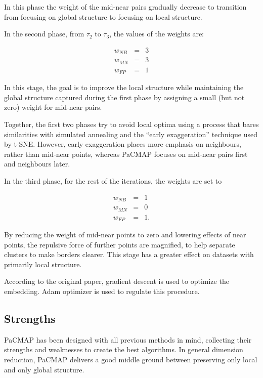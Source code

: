 In this phase the weight of the mid-near pairs gradually decrease to transition from focusing on global structure to focusing on local structure.

In the second phase, from $\tau_2$ to $\tau_3$, the values of the weights are:

\begin{equation}
	\begin{aligned}
		w_{NB} & = & 3 \\
		w_{MN} & = & 3 \\
		w_{FP} & = & 1
	\end{aligned}
\end{equation}

In this stage, the goal is to improve the local structure while maintaining the global structure captured during the first phase by assigning a small (but not zero) weight for mid-near pairs.

Together, the first two phases try to avoid local optima using a process that bares similarities with simulated annealing and the ``early exaggeration'' technique used by t-SNE. However, early exaggeration places more emphasis on neighbours, rather than mid-near points, whereas PaCMAP focuses on mid-near pairs first and neighbours later.

In the third phase, for the rest of the iterations, the weights are set to

\begin{equation}
	\begin{aligned}
		w_{NB} & = & 1 \\
		w_{MN} & = & 0 \\
		w_{FP} & = & 1.
	\end{aligned}
\end{equation}

By reducing the weight of mid-near points to zero and lowering effects of near points, the repulsive force of further points are magnified, to help separate clusters to make borders clearer. This stage has a greater effect on datasets with primarily local structure. 

According to the original paper, gradient descent is used to optimize the embedding. Adam \cite{bib:adam} optimizer is used to regulate this procedure.

\subsection{Strengths}

PaCMAP has been designed with all previous methods in mind, collecting their strengths and weaknesses to create the best algorithms. In general dimension reduction, PaCMAP delivers a good middle ground between preserving only local and only global structure. 


